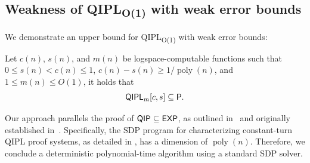 \documentclass[11pt, a4paper]{article}
\numberwithin{equation}{section}
\numberwithin{figure}{section}
\newcommand{\Ptime}{\textnormal{\textsf{P}}\xspace}
\newcommand{\EXP}{\textnormal{\textsf{EXP}}\xspace}
\newcommand{\QIP}{\textnormal{\textsf{QIP}}\xspace}
\newcommand{\QIPL}{\textnormal{\textsf{QIPL}}\xspace}
\newcommand{\QIPLconst}{\texorpdfstring{\textnormal{\textsf{QIPL}\textsubscript{O(1)}}}\xspace}
\DeclareMathOperator\poly{poly}
\begin{document}
\subsection{Weakness of \QIPLconst{} with weak error bounds}
\label{subsec:QIPLconst-weakErrorBound-in-P}

We demonstrate an upper bound for \QIPLconst{} with weak error bounds: 
\begin{lemma}[\QIPLconst{} is in \Ptime{}]
    \label{lemma:QIPLconst-in-P}
    Let $c(n)$, $s(n)$, and $m(n)$ be logspace-computable functions such that $0 \leq s(n) < c(n) \leq 1$, $c(n) - s(n) \geq 1/\poly(n)$, and $1 \leq m(n) \leq O(1)$, it holds that 
    \[\QIPL_m[c,s] \subseteq \Ptime.\]
\end{lemma}

Our approach parallels the proof of $\QIP \subseteq \EXP$, as outlined in~\cite[Page 31]{Watrous16tutorial} and originally established in~\cite[Section 6]{KW00}. Specifically, the SDP program for characterizing constant-turn \QIPL{} proof systems, as detailed in , has a dimension of $\poly(n)$. Therefore, we conclude a deterministic polynomial-time algorithm using a standard SDP solver. 
\end{document}
